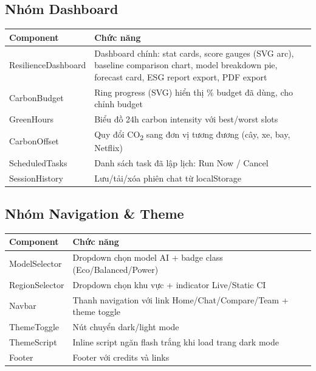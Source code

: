 \documentclass[12pt,a4paper]{article}
\begin{document}
\subsection{Nhóm Dashboard}

\begin{table}[h]
    \centering
    \begin{tabular}{lp{9cm}}
        \toprule
        \textbf{Component} & \textbf{Chức năng} \\
        \midrule
        ResilienceDashboard & Dashboard chính: stat cards, score gauges (SVG arc), baseline comparison chart, model breakdown pie, forecast card, ESG report export, PDF export \\
        CarbonBudget & Ring progress (SVG) hiển thị \% budget đã dùng, cho chỉnh budget \\
        GreenHours & Biểu đồ 24h carbon intensity với best/worst slots \\
        CarbonOffset & Quy đổi CO\textsubscript{2} sang đơn vị tương đương (cây, xe, bay, Netflix) \\
        ScheduledTasks & Danh sách task đã lập lịch: Run Now / Cancel \\
        SessionHistory & Lưu/tải/xóa phiên chat từ localStorage \\
        \bottomrule
    \end{tabular}
\end{table}

\subsection{Nhóm Navigation \& Theme}

\begin{table}[h]
    \centering
    \begin{tabular}{lp{9cm}}
        \toprule
        \textbf{Component} & \textbf{Chức năng} \\
        \midrule
        ModelSelector & Dropdown chọn model AI + badge class (Eco/Balanced/Power) \\
        RegionSelector & Dropdown chọn khu vực + indicator Live/Static CI \\
        Navbar & Thanh navigation với link Home/Chat/Compare/Team + theme toggle \\
        ThemeToggle & Nút chuyển dark/light mode \\
        ThemeScript & Inline script ngăn flash trắng khi load trang dark mode \\
        Footer & Footer với credits và links \\
        \bottomrule
    \end{tabular}
\end{table}
\end{document}
